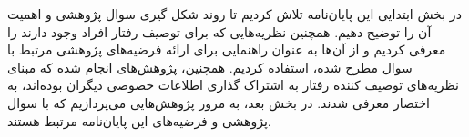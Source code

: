 در بخش ابتدایی این پایان‌نامه تلاش کردیم تا روند شکل گیری سوال پژوهشی و اهمیت آن را توضیح دهیم.
همچنین نظریه‌هایی که برای توصیف رفتار افراد وجود دارند را معرفی کردیم و از آن‌ها به عنوان راهنمایی
برای ارائه فرضیه‌های پژوهشی مرتبط با سوال‌ مطرح شده، استفاده کردیم.
همچنین، پژوهش‌های انجام شده که مبنای نظریه‌های توصیف کننده رفتار به اشتراک گذاری اطلاعات خصوصی دیگران
بوده‌اند، به اختصار معرفی شدند. در بخش بعد، به مرور پژوهش‌هایی می‌پردازیم که با سوال پژوهشی و فرضیه‌های این پایان‌نامه مرتبط هستند.